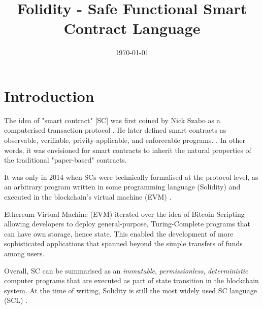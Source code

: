 \documentclass[oneside]{ecsproject}     %
\begin{document}
\frontmatter
\title      {Folidity - Safe Functional Smart Contract Language}
\addresses  {\groupname\\\deptname\\\univname}
\date       {\today}
\subject    {}
\keywords   {}
\maketitle
\tableofcontents
\mainmatter

\chapter{Introduction}

The idea of "smart contract" [SC] was first coined by Nick Szabo as a computerised transaction protocol \cite{nz_sc}.
He later defined smart contracts as observable, verifiable, privity-applicable, and enforceable programs. \cite{nz_sc_bb}.
In other words, it was envisioned for smart contracts to inherit the natural properties of the traditional
"paper-based" contracts.

It was only in 2014 when SCs were technically formalised at the protocol level, as an arbitrary program
written in some programming language (Solidity) and executed in the blockchain's virtual machine (EVM) \cite{eth_yellow_paper}.

Ethereum Virtual Machine (EVM) iterated over the idea of Bitcoin Scripting allowing developers to deploy general-purpose, Turing-Complete
programs that can have own storage, hence state. This enabled the development of more sophisticated applications that spanned beyond
the simple transfers of funds among users.

Overall, SC can be summarised as an \textit{immutable}, \textit{permissionless}, \textit{deterministic} computer programs 
that are executed as part of state transition in the blockchain system. 
At the time of writing, Solidity is still the most widely used SC language (SCL) \cite{sc_survey}.
\end{document}
